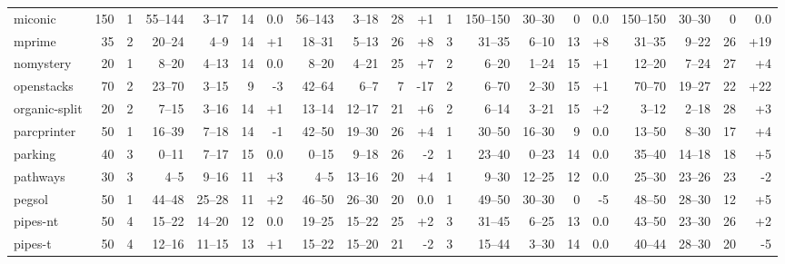 \documentclass{article}
\begin{document}
\begin{table}
\begin{tabular}{l@{}rr|rrrr|rrrr|r|rrrr|rrrr}
      miconic &   150 &   1 & 55--144 &  3--17 & 14 &              0.0 & 56--143 &  3--18 & 28 &  {\color{blue}+1} &   1 & 150--150 & 30--30 &  0 &               0.0 & 150--150 & 30--30 &  0 &               0.0 \\
       mprime &    35 &   2 &  20--24 &   4--9 & 14 & {\color{blue}+1} &  18--31 &  5--13 & 26 &  {\color{blue}+8} &   3 &   31--35 &  6--10 & 13 &  {\color{blue}+8} &   31--35 &  9--22 & 26 & {\color{blue}+19} \\
    nomystery &    20 &   1 &   8--20 &  4--13 & 14 &              0.0 &   8--20 &  4--21 & 25 &  {\color{blue}+7} &   2 &    6--20 &  1--24 & 15 &  {\color{blue}+1} &   12--20 &  7--24 & 27 &  {\color{blue}+4} \\
   openstacks &    70 &   2 &  23--70 &  3--15 &  9 &  {\color{red}-3} &  42--64 &   6--7 &  7 &  {\color{red}-17} &   2 &    6--70 &  2--30 & 15 &  {\color{blue}+1} &   70--70 & 19--27 & 22 & {\color{blue}+22} \\
organic-split &    20 &   2 &   7--15 &  3--16 & 14 & {\color{blue}+1} &  13--14 & 12--17 & 21 &  {\color{blue}+6} &   2 &    6--14 &  3--21 & 15 &  {\color{blue}+2} &    3--12 &  2--18 & 28 &  {\color{blue}+3} \\
  parcprinter &    50 &   1 &  16--39 &  7--18 & 14 &  {\color{red}-1} &  42--50 & 19--30 & 26 &  {\color{blue}+4} &   1 &   30--50 & 16--30 &  9 &               0.0 &   13--50 &  8--30 & 17 &  {\color{blue}+4} \\
      parking &    40 &   3 &   0--11 &  7--17 & 15 &              0.0 &   0--15 &  9--18 & 26 &   {\color{red}-2} &   1 &   23--40 &  0--23 & 14 &               0.0 &   35--40 & 14--18 & 18 &  {\color{blue}+5} \\
     pathways &    30 &   3 &    4--5 &  9--16 & 11 & {\color{blue}+3} &    4--5 & 13--16 & 20 &  {\color{blue}+4} &   1 &    9--30 & 12--25 & 12 &               0.0 &   25--30 & 23--26 & 23 &   {\color{red}-2} \\
       pegsol &    50 &   1 &  44--48 & 25--28 & 11 & {\color{blue}+2} &  46--50 & 26--30 & 20 &               0.0 &   1 &   49--50 & 30--30 &  0 &   {\color{red}-5} &   48--50 & 28--30 & 12 &  {\color{blue}+5} \\
     pipes-nt &    50 &   4 &  15--22 & 14--20 & 12 &              0.0 &  19--25 & 15--22 & 25 &  {\color{blue}+2} &   3 &   31--45 &  6--25 & 13 &               0.0 &   43--50 & 23--30 & 26 &  {\color{blue}+2} \\
      pipes-t &    50 &   4 &  12--16 & 11--15 & 13 & {\color{blue}+1} &  15--22 & 15--20 & 21 &   {\color{red}-2} &   3 &   15--44 &  3--30 & 14 &               0.0 &   40--44 & 28--30 & 20 &   {\color{red}-5} \\

\end{tabular}
\end{table}
\end{document}
